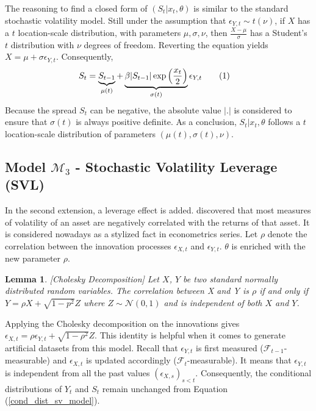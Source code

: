 \documentclass[11pt,a4,twosided,singlespacing,titlepagenumber=on]{scrreprt}
\numberwithin{equation}{chapter} %
\newtheorem{lemma}[theorem]{Lemma}%
\theoremstyle{remark}
\newcommand\numberthis{\addtocounter{equation}{1}\tag{\theequation}}
\begin{document}
The reasoning to find a closed form of $(S_t | x_t, \theta)$ is similar to the standard stochastic volatility model. Still under the assumption that $\epsilon_{Y,t} \sim t(\nu)$, if $X$ has a $t$ location-scale distribution, with parameters $\mu, \sigma, \nu$, then $\frac{X-\mu}{\sigma}$ has a Student's $t$ distribution with $\nu$ degrees of freedom. Reverting the equation yields $X = \mu + \sigma \epsilon_{Y,t}$. Consequently,
\begin{align*}
S_t  &= \underbrace{S_{t-1}}_{\mu(t)} + \underbrace{\beta |S_{t-1}| \exp \left( \frac{x_t}{2} \right)}_{\sigma(t)} \epsilon_{Y,t} \numberthis
\end{align*}
Because the spread $S_t$ can be negative, the absolute value $|.|$ is considered to ensure that $\sigma(t)$ is always positive definite. As a conclusion, $S_t | x_t, \theta$ follows a $t$ location-scale distribution of parameters $(\mu(t), \sigma(t), \nu)$. 

\subsection{Model $\mathcal{M}_3$ - Stochastic Volatility Leverage (SVL)}
In the second extension, a leverage effect is added. \cite{black1976} discovered that most measures of volatility of an asset are negatively correlated with the returns of that asset. It is considered nowadays as a stylized fact in econometrics series. Let $\rho$ denote the correlation between the innovation processes $\epsilon_{X,t}$ and $\epsilon_{Y,t}$. $\theta$ is enriched with the new parameter $\rho$.

\begin{lemma}
\textit{
[Cholesky Decomposition] Let $X$, $Y$ be two standard normally distributed random variables. The correlation between X and Y is $\rho$ if and only if $Y = \rho X + \sqrt{1-p^2} Z$ where $Z \sim \mathcal{N}(0,1)$ and is independent of both $X$ and $Y$.
}
\end{lemma}
Applying the Cholesky decomposition on the innovations gives $\epsilon_{X,t} = \rho \epsilon_{Y,t} + \sqrt{1-\rho^2} Z$. This identity is helpful when it comes to generate artificial datasets from this model. Recall that $\epsilon_{Y,t}$ is first measured ($\mathcal{F}_{t-1}$-measurable) and $\epsilon_{X,t}$ is updated accordingly ($\mathcal{F}_t$-measurable). It means that $\epsilon_{Y,t}$ is independent from all the past values $(\epsilon_{X,s})_{s < t}$. Consequently, the conditional distributions of $Y_t$ and $S_t$ remain unchanged from Equation (\ref{cond_dist_sv_model}).
\end{document}
